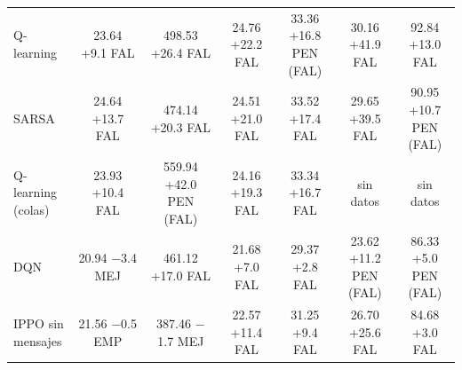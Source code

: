 \begin{table}[!tbp]
\begin{tabular}{lcccccc}
Q-learning & \makecell{23.64\\+9.1 FAL} & \makecell{498.53\\+26.4 FAL} & \makecell{24.76\\+22.2 FAL} & \makecell{33.36\\+16.8\\PEN (FAL)} & \makecell{30.16\\+41.9 FAL} & \makecell{92.84\\+13.0 FAL} \\
SARSA & \makecell{24.64\\+13.7 FAL} & \makecell{474.14\\+20.3 FAL} & \makecell{24.51\\+21.0 FAL} & \makecell{33.52\\+17.4 FAL} & \makecell{29.65\\+39.5 FAL} & \makecell{90.95\\+10.7\\PEN (FAL)} \\
\makecell[l]{Q-learning\\(colas)} & \makecell{23.93\\+10.4 FAL} & \makecell{559.94\\+42.0\\PEN (FAL)} & \makecell{24.16\\+19.3 FAL} & \makecell{33.34\\+16.7 FAL} & sin datos & sin datos \\
DQN & \makecell{20.94\\$-$3.4 MEJ} & \makecell{461.12\\+17.0 FAL} & \makecell{21.68\\+7.0 FAL} & \makecell{29.37\\+2.8 FAL} & \makecell{23.62\\+11.2\\PEN (FAL)} & \makecell{86.33\\+5.0\\PEN (FAL)} \\
\makecell[l]{IPPO sin\\mensajes} & \makecell{21.56\\$-$0.5 EMP} & \makecell{387.46\\$-$1.7 MEJ} & \makecell{22.57\\+11.4 FAL} & \makecell{31.25\\+9.4 FAL} & \makecell{26.70\\+25.6 FAL} & \makecell{84.68\\+3.0 FAL} \\

\end{tabular}
\end{table}
